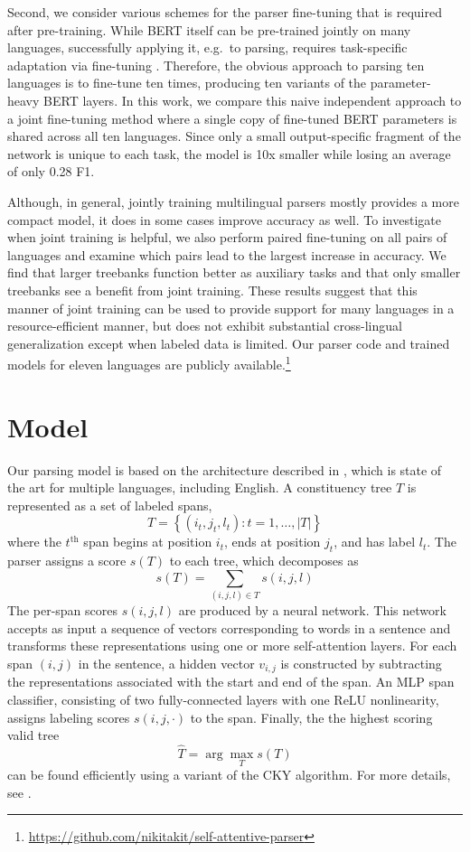 \documentclass[11pt,a4paper]{article}
\begin{document}
Second, we consider various schemes for the parser fine-tuning that is required after pre-training. While BERT itself can be pre-trained jointly on many languages, successfully applying it, e.g.\ to parsing, requires task-specific adaptation via fine-tuning \cite{devlin_bert:2018}.  Therefore, the obvious approach to parsing ten languages is to fine-tune ten times, producing ten variants of the parameter-heavy BERT layers.  In this work, we compare this naive independent approach to a joint fine-tuning method where a single copy of fine-tuned BERT parameters is shared across all ten languages.  Since only a small output-specific fragment of the network is unique to each task, the model is 10x smaller while losing an average of only 0.28 F1.

Although, in general, jointly training multilingual parsers mostly provides a more compact model, it does in some cases improve accuracy as well. To investigate when joint training is helpful, we also perform paired fine-tuning on all pairs of languages and examine which pairs lead to the largest increase in accuracy. We find that larger treebanks function better as auxiliary tasks and that only smaller treebanks see a benefit from joint training. These results suggest that this manner of joint training can be used to provide support for many languages in a resource-efficient manner, but does not exhibit substantial cross-lingual generalization except when labeled data is limited.
Our parser code and trained models for eleven languages are publicly available.\footnote{\href{https://github.com/nikitakit/self-attentive-parser}{https://github.com/nikitakit/self-attentive-parser}}

\section{Model}

Our parsing model is based on the architecture described in \citet{kitaev_2018_self_attentive}, which is state of the art for multiple languages, including English.
A constituency tree $T$ is represented as a set of labeled spans,
\[
T = \left\{(i_t, j_t, l_t) : t=1,\ldots,\left|T\right|\right\}
\]
where the $t^{\text{th}}$ span begins at position $i_t$, ends at position $j_t$, and has label $l_t$. The parser assigns a score $s(T)$ to each tree, which decomposes as
\[
s(T) = \sum_{(i,j,l) \in T} s(i,j,l)
\]
The per-span scores $s(i,j,l)$ are produced by a neural network. This network accepts as input a sequence of vectors corresponding to words in a sentence and transforms these representations using one or more self-attention layers. For each span $(i,j)$ in the sentence, a hidden vector $v_{i,j}$ is constructed by subtracting the representations associated with the start and end of the span. An MLP span classifier, consisting of two fully-connected layers with one ReLU nonlinearity, assigns labeling scores $s(i,j,\cdot)$ to the span. Finally, the the highest scoring valid tree \[\hat{T} = \arg\max_T s(T)\] can be found efficiently using a variant of the CKY algorithm. For more details, see \citet{kitaev_2018_self_attentive}.
\end{document}
